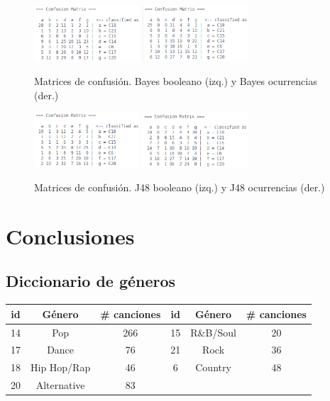 \documentclass[spanish,11pt,letterpaper]{article}
\begin{document}
\begin{figure}[h]
\centering
\includegraphics[width=0.35\textwidth]{bayes_spop_boolean}
\includegraphics[width=0.35\textwidth]{bayes_spop_counter}
\caption{Matrices de confusión. Bayes booleano (izq.) y Bayes ocurrencias (der.)}
\end{figure}
\begin{figure}[h]
\centering
\includegraphics[width=0.35\textwidth]{j48_spop_boolean}
\includegraphics[width=0.35\textwidth]{j48_spop_counter}
\caption{Matrices de confusión. J48 booleano (izq.) y J48 ocurrencias (der.)}
\end{figure}

\section{Conclusiones}

\begin{appendices}
\section{Diccionario de géneros}
\begin{center}
\begin{tabular}{|c|c|c||c|c|c|}
\hline
id & Género & \# canciones & id & Género & \# canciones\\
\hline
14 & Pop & 266 & 15 & R\&B/Soul & 20 \\
17 & Dance & 76 & 21 & Rock & 36 \\
18 & Hip Hop/Rap & 46 & 6 & Country & 48 \\
20 & Alternative & 83 & & & \\
\hline
\end{tabular}
\end{center}
\end{appendices}
\end{document}
